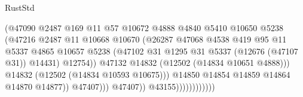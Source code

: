 \begin{lexlean}{RustStd}
\begin{coremodule}
                                            (@47090
                                              @2487
                                              @169
                                              @11
                                              @57
                                              @10672
                                              @4888
                                              @4840
                                              @5410
                                              @10650
                                              @5238
                                              (@47216
                                                @2487
                                                @11
                                                @10668
                                                @10670
                                                (@26287
                                                  @47068
                                                  @4538
                                                  @419
                                                  @95
                                                  @11
                                                  @5337
                                                  @4865
                                                  @10657
                                                  @5238
                                                  (@47102
                                                    @31
                                                    @1295
                                                    @31
                                                    @5337
                                                    (@12676 (@47107 @31))
                                                    @14431)
                                                  @12754))
                                              @47132
                                              @14832
                                              (@12502 (@14834 @10651 @4888)))
                                            @14832
                                            (@12502 (@14834 @10593 @10675)))
                                          @14850
                                          @14854
                                          @14859
                                          @14864
                                          @14870
                                          @14877))
                                      @47407)))
                                @47407))
                            @43155))))))))))))

\end{coremodule}
\end{lexlean}

